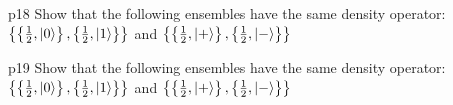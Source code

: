 \documentclass[a4paper, 11pt]{article}
\begin{document}
\begin{problem}{%
	}{p18%
	}
	Show that the following ensembles have the same density operator: $\left\{\left\{\frac12,\ket{0}\right\},\left\{\frac12,\ket{1}\right\}\right\}$ and $\left\{\left\{\frac12,\ket{+}\right\},\left\{\frac12,\ket{-}\right\}\right\}$
\end{problem}


\begin{problem}{%
	}{p19%
	}
	Show that the following ensembles have the same density operator: $\left\{\left\{\frac12,\ket{0}\right\},\left\{\frac12,\ket{1}\right\}\right\}$ and $\left\{\left\{\frac12,\ket{+}\right\},\left\{\frac12,\ket{-}\right\}\right\}$
\end{problem}
\end{document}
